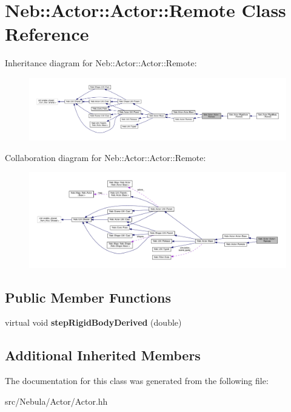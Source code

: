 \hypertarget{classNeb_1_1Actor_1_1Actor_1_1Remote}{\section{Neb\-:\-:Actor\-:\-:Actor\-:\-:Remote Class Reference}
\label{classNeb_1_1Actor_1_1Actor_1_1Remote}
}


Inheritance diagram for Neb\-:\-:Actor\-:\-:Actor\-:\-:Remote\-:
\nopagebreak
\begin{figure}[H]
\begin{center}
\leavevmode
\includegraphics[width=350pt]{classNeb_1_1Actor_1_1Actor_1_1Remote__inherit__graph}
\end{center}
\end{figure}


Collaboration diagram for Neb\-:\-:Actor\-:\-:Actor\-:\-:Remote\-:
\nopagebreak
\begin{figure}[H]
\begin{center}
\leavevmode
\includegraphics[width=350pt]{classNeb_1_1Actor_1_1Actor_1_1Remote__coll__graph}
\end{center}
\end{figure}
\subsection*{Public Member Functions}
\begin{DoxyCompactItemize}
\item 
\hypertarget{classNeb_1_1Actor_1_1Actor_1_1Remote_a2a5316f83b7904650c61dd4b70b0ebf3}{virtual void {\bfseries step\-Rigid\-Body\-Derived} (double)}\label{classNeb_1_1Actor_1_1Actor_1_1Remote_a2a5316f83b7904650c61dd4b70b0ebf3}

\end{DoxyCompactItemize}
\subsection*{Additional Inherited Members}


The documentation for this class was generated from the following file\-:\begin{DoxyCompactItemize}
\item 
src/\-Nebula/\-Actor/Actor.\-hh\end{DoxyCompactItemize}
